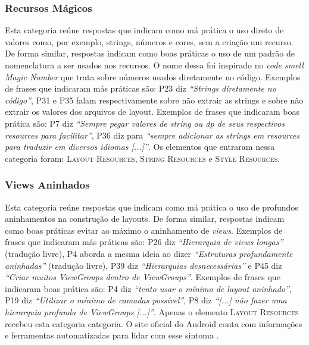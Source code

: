 \subsubsection{Recursos M\'agicos}
Esta categoria re\'une respostas que indicam como m\'a pr\'atica o uso direto de valores como, por exemplo, strings, n\'umeros e cores, sem a cria\c{c}\~ao um recurso. De forma similar, respostas indicam como boas pr\'aticas o uso de um padr\~ao de nomenclatura a ser usados nos recursos. O nome dessa foi inspirado no \textit{code smell} \textit{Magic Number} \cite{Martin:2008:CCH:1388398} que trata sobre n\'umeros usados diretamente no c\'odigo. Exemplos de frases que indicaram m\'as pr\'aticas s\~ao: P23 diz \textit{``Strings diretamente no c\'odigo''}, P31 e P35 falam respectivamente sobre n\~ao extrair as strings e sobre n\~ao extrair os valores dos arquivos de layout. Exemplos de frases que indicaram boas pr\'atica s\~ao: P7 diz \textit{``Sempre pegar valores de string ou dp de seus respectivos resources para facilitar''}, P36 diz para \textit{``sempre adicionar as strings em resources para traduzir em diversos idiomas [...]''}. Os elementos que entraram nessa categoria foram: \textsc{Layout Resources}, \textsc{String Resources} e \textsc{Style Resources}. 

\subsubsection{Views Aninhados} 
Esta categoria re\'une respostas que indicam como m\'a pr\'atica o uso de profundos aninhamentos na constru\c{c}\~ao de layouts. De forma similar, respostas indicam como boas pr\'aticas evitar ao m\'aximo o aninhamento de \textit{views}. Exemplos de frases que indicaram m\'as pr\'aticas s\~ao: P26 diz \textit{``Hierarquia de views longas''} (tradu\c{c}\~ao livre), P4 aborda a mesma ideia ao dizer \textit{``Estruturas profundamente aninhadas''} (tradu\c{c}\~ao livre), P39 diz \textit{``Hierarquias desnecess\'arias''} e P45 diz \textit{``Criar muitos ViewGroups dentro de ViewGroups''}. Exemplos de frases que indicaram boas pr\'atica s\~ao: P4 diz \textit{``tento usar o m\'inimo de layout aninhado''}, P19 diz \textit{``Utilizar o m\'inimo de camadas poss\'ivel''}, P8 diz \textit{``[...] n\~ao fazer uma hierarquia profunda de ViewGroups [...]''}. Apenas o elemento \textsc{Layout Resources} recebeu esta categoria categoria. O site oficial do Android conta com informa\c{c}\~oes e ferramentas automatizadas para lidar com esse sintoma \cite{OptmizingViewHierarchies}.


